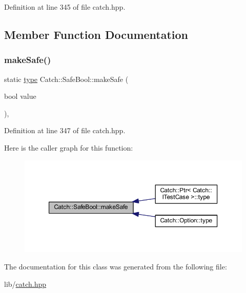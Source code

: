 Definition at line 345 of file catch.\+hpp.



\subsection{Member Function Documentation}
\hypertarget{class_catch_1_1_safe_bool_af0ea63d9820f8bf7a8b76377913c4e77}{}\label{class_catch_1_1_safe_bool_af0ea63d9820f8bf7a8b76377913c4e77} 
\subsubsection{\texorpdfstring{make\+Safe()}{makeSafe()}}
{\footnotesize\ttfamily static \hyperlink{class_catch_1_1_safe_bool_a39eef9baed296299d625a54d54a2a958}{type} Catch\+::\+Safe\+Bool\+::make\+Safe (\begin{DoxyParamCaption}\item[{bool}]{value }\end{DoxyParamCaption})\hspace{0.3cm}{\ttfamily [inline]}, {\ttfamily [static]}}



Definition at line 347 of file catch.\+hpp.

Here is the caller graph for this function\+:\nopagebreak
\begin{figure}[H]
\begin{center}
\leavevmode
\includegraphics[width=350pt]{class_catch_1_1_safe_bool_af0ea63d9820f8bf7a8b76377913c4e77_icgraph}
\end{center}
\end{figure}


The documentation for this class was generated from the following file\+:\begin{DoxyCompactItemize}
\item 
lib/\hyperlink{catch_8hpp}{catch.\+hpp}\end{DoxyCompactItemize}
